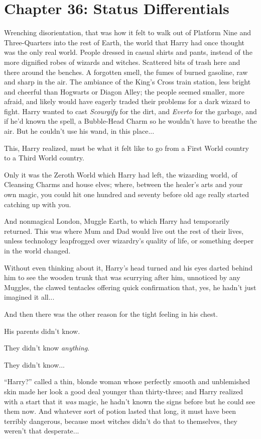 \chapter{Chapter 36: Status Differentials}
Wrenching disorientation, that was how it felt to walk out of Platform Nine and Three-Quarters into the rest of Earth, the world that Harry had once thought was the only real world. People dressed in casual shirts and pants, instead of the more dignified robes of wizards and witches. Scattered bits of trash here and there around the benches. A forgotten smell, the fumes of burned gasoline, raw and sharp in the air. The ambiance of the King's Cross train station, less bright and cheerful than Hogwarts or Diagon Alley; the people seemed smaller, more afraid, and likely would have eagerly traded their problems for a dark wizard to fight. Harry wanted to cast \emph{Scourgify} for the dirt, and \emph{Everto} for the garbage, and if he'd known the spell, a Bubble-Head Charm so he wouldn't have to breathe the air. But he couldn't use his wand, in this place...

This, Harry realized, must be what it felt like to go from a First World country to a Third World country.

Only it was the Zeroth World which Harry had left, the wizarding world, of Cleansing Charms and house elves; where, between the healer's arts and your own magic, you could hit one hundred and seventy before old age really started catching up with you.

And nonmagical London, Muggle Earth, to which Harry had temporarily returned. This was where Mum and Dad would live out the rest of their lives, unless technology leapfrogged over wizardry's quality of life, or something deeper in the world changed.

Without even thinking about it, Harry's head turned and his eyes darted behind him to see the wooden trunk that was scurrying after him, unnoticed by any Muggles, the clawed tentacles offering quick confirmation that, yes, he hadn't just imagined it all...

And then there was the other reason for the tight feeling in his chest.

His parents didn't know.

They didn't know \emph{anything}.

They didn't know...

``Harry?'' called a thin, blonde woman whose perfectly smooth and unblemished skin made her look a good deal younger than thirty-three; and Harry realized with a start that it \emph{was} magic, he hadn't known the signs before but he could see them now. And whatever sort of potion lasted that long, it must have been terribly dangerous, because most witches didn't do that to themselves, they weren't that desperate...

